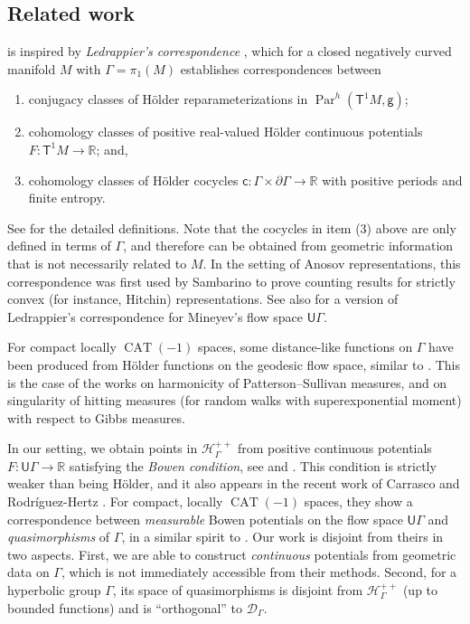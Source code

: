 \documentclass[twoside]{amsart}
\theoremstyle{definition}
\numberwithin{equation}{section}
\numberwithin{theorem}{section}
\newcommand{\msf}[1]{\mathsf{#1}}
\newcommand{\R}{\mathbb{R}}
\newcommand{\calD}{\mathcal{D}}
\newcommand{\calH}{\mathcal{H}}
\newcommand{\scrH}{\mathscr{H}}
\newcommand{\G}{\Gamma}
\DeclareMathOperator{\CAT}{CAT}
\DeclareMathOperator{\Par}{Par}
\newcommand{\ra}{\rightarrow}
\newcommand{\UG}{\msf{U}\G}
\newcommand{\vg}{\msf{g}}
\begin{document}
\subsection{Related work}\label{subsec:introotherwork}
 is inspired by \emph{Ledrappier's correspondence} \cite{ledrappier}, which for a closed negatively curved manifold $M$ with $\G=\pi_1(M)$ establishes correspondences between
\begin{enumerate}
    \item conjugacy classes of H\"older reparameterizations in $\Par^h(\msf{T}^1M,\vg)$; 
    \item cohomology classes of positive real-valued H\"older continuous potentials $F:\msf{T}^1M\ra \R$; and,
    \item cohomology classes of H\"older cocycles $\msf{c}:\G \times \partial \G\ra \R$ with positive periods and finite entropy.
\end{enumerate}


See  for the detailed definitions. Note that the cocycles in item (3) above are only defined in terms of $\G$, and therefore can be obtained from geometric information that is not necessarily related to $M$. In the setting of Anosov representations, this correspondence was first used by Sambarino
\cite{sambarino.quantitative} to prove counting results for strictly convex (for instance, Hitchin) representations. See also \cite{sambarino.report} for a version of Ledrappier's correspondence for Mineyev's flow space $\UG$.

For compact locally $\CAT(-1)$ spaces, some distance-like functions on $\G$ have been produced from H\"older functions on the geodesic flow space, similar to .
This is the case of the works \cite{connell-muchnik.gibbs,connell-muchnik.harmonicity} on harmonicity of Patterson--Sullivan measures, and \cite{gekhtman-tiozzo} on singularity of hitting measures (for random walks with superexponential moment) with respect to Gibbs measures.


In our setting, we obtain points in $\scrH_\G^{++}$ from positive continuous potentials $F:\UG \ra \R$ satisfying the \emph{Bowen condition}, see  and . This condition is strictly weaker than being H\"older, and it also appears in the recent work of Carrasco and Rodr\'iguez-Hertz \cite{carasco-hertz}. For compact, locally $\CAT(-1)$ spaces, they show a correspondence between \emph{measurable} Bowen potentials on the flow space $\UG$ and \emph{quasimorphisms} of $\G$, in a similar spirit to . 
Our work is disjoint from theirs in two aspects. First, we are able to construct \emph{continuous} potentials from geometric data on $\G$, which is not immediately accessible from their methods. Second, for a hyperbolic group $\G$, its space of quasimorphisms is disjoint from $\calH_\G^{++}$ (up to bounded functions) and is ``orthogonal'' to $\calD_\G$.
\end{document}

